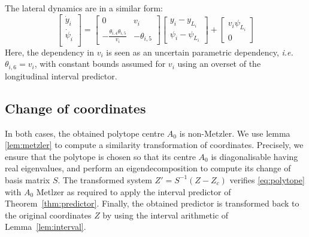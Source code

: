 \documentclass{article}
\begin{document}
The lateral dynamics are in a similar form:
\begin{equation*}
\begin{bmatrix}
\dot{y}_i \\
\dot{\psi}_i \\
\end{bmatrix}
=
\begin{bmatrix}
0 & v_i \\
-\frac{\theta_{i,4} \theta_{i,5}}{v_i} & -\theta_{i,5}
\end{bmatrix}
\begin{bmatrix}
y_i - y_{L_i} \\
\psi_i - \psi_{L_i}
\end{bmatrix}
+
\begin{bmatrix}
v_i\psi_{L_i} \\
0
\end{bmatrix}
\end{equation*}
Here, the dependency in $v_i$ is seen as an uncertain parametric dependency, \emph{i.e.} $\theta_{i,6}=v_i$, with constant bounds assumed for $v_i$ using an overset of the longitudinal interval predictor.

\subsection{Change of coordinates}
In both cases, the obtained polytope centre $A_0$ is non-Metzler.
We use lemma \ref{lem:metzler} to compute a similarity transformation of coordinates. Precisely, we ensure that the polytope is chosen so that its centre $A_0$ is diagonalisable having real eigenvalues, and perform an eigendecomposition to compute its change of basis matrix $S$. The transformed system $Z'=S^{-1}(Z-Z_c)$ verifies \eqref{eq:polytope} with $A_0$ Metlzer as required to apply the interval predictor of Theorem~\ref{thm:predictor}. Finally, the obtained predictor is transformed back to the original coordinates $Z$ by using the interval arithmetic of Lemma~\ref{lem:interval}.


\printbibliography
\end{document}
